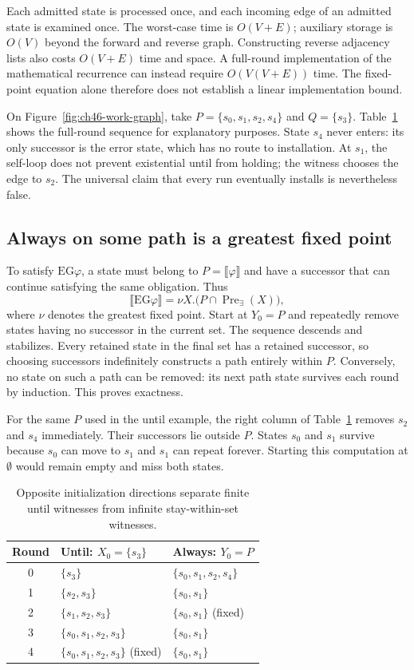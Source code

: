 Each admitted state is processed once, and each incoming edge of an admitted state is examined once.
The worst-case time is $O(V+E)$; auxiliary storage is $O(V)$ beyond the forward and reverse graph.
Constructing reverse adjacency lists also costs $O(V+E)$ time and space.
A full-round implementation of the mathematical recurrence can instead require $O(V(V+E))$ time.
The fixed-point equation alone therefore does not establish a linear implementation bound.

On Figure~\ref{fig:ch46-work-graph}, take $P=\{s_0,s_1,s_2,s_4\}$ and $Q=\{s_3\}$.
Table~\ref{tab:ch46-fixpoint-rounds} shows the full-round sequence for explanatory purposes.
State $s_4$ never enters: its only successor is the error state, which has no route to installation.
At $s_1$, the self-loop does not prevent existential until from holding; the witness chooses the edge to $s_2$.
The universal claim that every run eventually installs is nevertheless false.

\subsection{Always on some path is a greatest fixed point}
\label{sec:ch46-eg}

To satisfy $\mathrm{EG}\varphi$, a state must belong to $P=\llbracket\varphi\rrbracket$ and have a successor that can continue satisfying the same obligation.
Thus
\[
 \llbracket\mathrm{EG}\varphi\rrbracket
 =\nu X.\bigl(P\cap\operatorname{Pre}_{\exists}(X)\bigr),
\]
where $\nu$ denotes the greatest fixed point.
Start at $Y_0=P$ and repeatedly remove states having no successor in the current set.
The sequence descends and stabilizes.
Every retained state in the final set has a retained successor, so choosing successors indefinitely constructs a path entirely within $P$.
Conversely, no state on such a path can be removed: its next path state survives each round by induction.
This proves exactness.

For the same $P$ used in the until example, the right column of Table~\ref{tab:ch46-fixpoint-rounds} removes $s_2$ and $s_4$ immediately.
Their successors lie outside $P$.
States $s_0$ and $s_1$ survive because $s_0$ can move to $s_1$ and $s_1$ can repeat forever.
Starting this computation at $\emptyset$ would remain empty and miss both states.

\begin{table}[tbp]
\centering
\caption{Opposite initialization directions separate finite until witnesses from infinite stay-within-set witnesses.}
\label{tab:ch46-fixpoint-rounds}
\begin{tabular}{cll}
\toprule
Round & Until: $X_0=\{s_3\}$ & Always: $Y_0=P$ \\
\midrule
0 & $\{s_3\}$ & $\{s_0,s_1,s_2,s_4\}$ \\
1 & $\{s_2,s_3\}$ & $\{s_0,s_1\}$ \\
2 & $\{s_1,s_2,s_3\}$ & $\{s_0,s_1\}$ (fixed) \\
3 & $\{s_0,s_1,s_2,s_3\}$ & $\{s_0,s_1\}$ \\
4 & $\{s_0,s_1,s_2,s_3\}$ (fixed) & $\{s_0,s_1\}$ \\
\bottomrule
\end{tabular}
\end{table}

